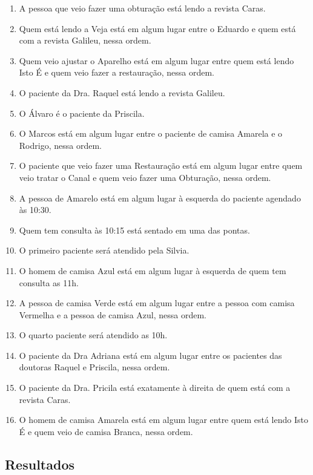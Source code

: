 \documentclass[final,a4paper]{article}
\begin{document}
  \begin{enumerate}
  \item A pessoa que veio fazer uma obturação está lendo a revista Caras.
  \item  Quem está lendo a Veja está em algum lugar entre o Eduardo e quem está com a revista Galileu, nessa ordem.
  \item  Quem veio ajustar o Aparelho está em algum lugar entre quem está lendo Isto É e quem veio fazer a restauração, nessa ordem.
  \item  O paciente da Dra. Raquel está lendo a revista Galileu.
  \item  O Álvaro é o paciente da Priscila.
  \item  O Marcos está em algum lugar entre o paciente de camisa Amarela e o Rodrigo, nessa ordem.
  \item  O paciente que veio fazer uma Restauração está em algum lugar entre quem veio tratar o Canal e quem veio fazer uma Obturação, nessa ordem.
  \item A pessoa de Amarelo está em algum lugar à esquerda do paciente agendado às 10:30.

    \item Quem tem consulta às 10:15 está sentado em uma das pontas.
    \item     O primeiro paciente será atendido pela Silvia.
    \item     O homem de camisa Azul está em algum lugar à esquerda de quem tem consulta as 11h.
    \item     A pessoa de camisa Verde está em algum lugar entre a pessoa com camisa Vermelha e a pessoa de camisa Azul, nessa ordem.
    \item     O quarto paciente será atendido as 10h.
        \item  O paciente da Dra Adriana está em algum lugar entre os pacientes das doutoras Raquel e Priscila, nessa ordem.
    \item     O paciente da Dra. Pricila está exatamente à direita de quem está com a revista Caras.
    \item     O homem de camisa Amarela está em algum lugar entre quem está lendo Isto É e quem veio de camisa Branca, nessa ordem.

  \end{enumerate} 




\subsection{Resultados}
\end{document}
